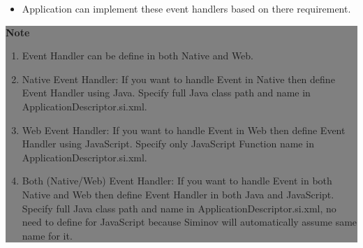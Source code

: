 \begin{enumerate}
\begin{itemize}
			\item \small Application can implement these event handlers based on there requirement.

		\end{itemize}

		\begin{center}
			\colorbox{grey}{
				\parbox[t]{.8\linewidth}{
					\fontsize{11pt}{11pt}\selectfont %
					\vspace*{0.1cm} %
		
					\hfill \textbf{Note} \\

					\hfill 	
					\begin{enumerate}
			
						\item \small Event Handler can be define in both Native and Web.

						\item \small Native Event Handler: If you want to handle Event in Native then define Event Handler using Java. Specify full Java class path and name in ApplicationDescriptor.si.xml.

						\item \small Web Event Handler: If you want to handle Event in Web then define Event Handler using JavaScript. Specify only JavaScript Function name in ApplicationDescriptor.si.xml.

						\item \small Both (Native/Web) Event Handler: If you want to handle Event in both Native and Web then define Event Handler in both Java and JavaScript. Specify full Java class path and name in ApplicationDescriptor.si.xml, no need to define for JavaScript because Siminov will automatically assume same name for it.

					\end{enumerate}

					\vspace*{0.0cm} %
		}
}

\end{center}


\end{enumerate}


